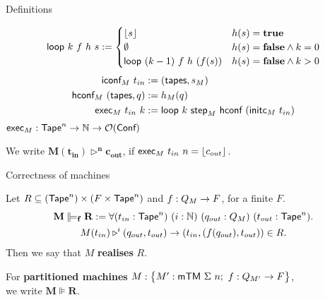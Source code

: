 \begin{frame}{Definitions}
  \begin{definition}[Execution]
    \begin{align*}
      \textsf{loop}~k~f~h~s :=
      \begin{cases}
        \left\lfloor {s}\right\rfloor                  & h(s) = \mathbf{true} \\
        \emptyset                     & h(s) = \mathbf{false} \land k = 0 \\
        \textsf{loop}~(k-1)~f~h~(f(s)) & h(s) = \mathbf{false} \land k > 0
      \end{cases}
    \end{align*}
    \pause%
    \begin{alignat*}{4}
      \textsf{iconf}_M ~ t_{in}          &:= (\textsf{tapes}, s_M) \\
      \textsf{hconf}_M ~ (\textsf{tapes}, q) &:= h_M(q) \\
      \textsf{exec}_M  ~ t_{in}~k        &:= \textsf{loop}~k~\textsf{step}_M~\textsf{hconf}~(\textsf{initc}_M~t_{in})
    \end{alignat*}
    {
      \small
      $\textsf{exec}_M : \textsf{Tape}^n \rightarrow \mathbb{N} \rightarrow \mathcal{O}(\textsf{Conf})$
    }
  \end{definition}

  \pause%
  We write $\mathbf{M(t_{in}) \triangleright^n c_{out}}$, if $\textsf{exec}_M~t_{in}~n= \left\lfloor {c_{out}}\right\rfloor$.
\end{frame}

\begin{frame}{Correctness of machines}
  \begin{definition}
    Let $R \subseteq (\textsf{Tape}^n) \times (F \times \textsf{Tape}^n)$ and $f : Q_M \rightarrow F$, for a finite $F$.\\
    \begin{multline*}
      \mathbf{M \VDash_f R} :=
      \forall (t_{in} : \Tape^n)~(i:\Nat)~(q_{out}:Q_M)~(t_{out} : \Tape^n). \\
      M(t_{in}) \triangleright^i (q_{out}, t_{out}) \rightarrow
      \left(t_{in}, \left(f(q_{out}), t_{out} \right) \right) \in R.
    \end{multline*}
    Then we say that $M$ \textbf{realises} $R$.
  \end{definition}
  \pause%
  For \textbf{partitioned machines} $M : \bigl\{ M' : \textsf{mTM}~\Sigma~n;~ f : Q_{M'} \rightarrow F \bigr \}$,\\
  we write $\mathbf{M \VDash R}$.
\end{frame}

